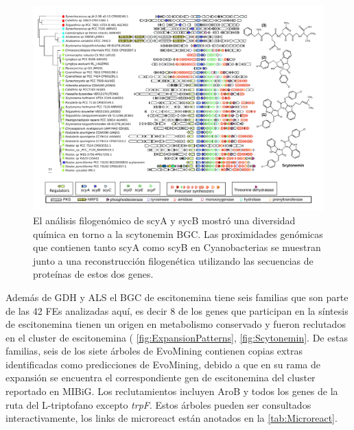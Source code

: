 \documentclass[12pt,twoside]{reedthesis}
\begin{document}
  \begin{figure}[h!tbp]
  \centering
  \includegraphics[angle = 90,scale = .8]{chapter2/FigurasPaper/Figure7.pdf}
  \caption[El cluster de scytonemina produce distintos metabolitos]{\footnotesize{El análisis filogenómico de scyA y sycB mostró una diversidad química en torno a la scytonemin BGC. Las proximidades genómicas que contienen tanto scyA como scyB en Cyanobacterias se muestran junto a una reconstrucción filogenética utilizando las secuencias de proteínas de estos dos genes.}}
  \label{fig:CorasonScytonemina}
  \end{figure}
  
  Además de GDH y ALS el BGC de escitonemina tiene seis familias que son
  parte de las 42 FEs analizadas aquí, es decir 8 de los genes que
  participan en la síntesis de escitonemina tienen un origen en
  metabolismo conservado y fueron reclutados en el cluster de escitonemina
  ( \autoref{fig:ExpansionPatterns}, \autoref{fig:Scytonemin}. De estas
  familias, seis de los siete árboles de EvoMining contienen copias extras
  identificadas como predicciones de EvoMining, debido a que en su rama de
  expansión se encuentra el correspondiente gen de escitonemina del
  cluster reportado en MIBiG. Los reclutamientos incluyen AroB y todos los
  genes de la ruta del L-triptofano excepto \emph{trpF}. Estos árboles
  pueden ser consultados interactivamente, los links de microreact están
  anotados en la \autoref{tab:Microreact}.
  
\end{document}

